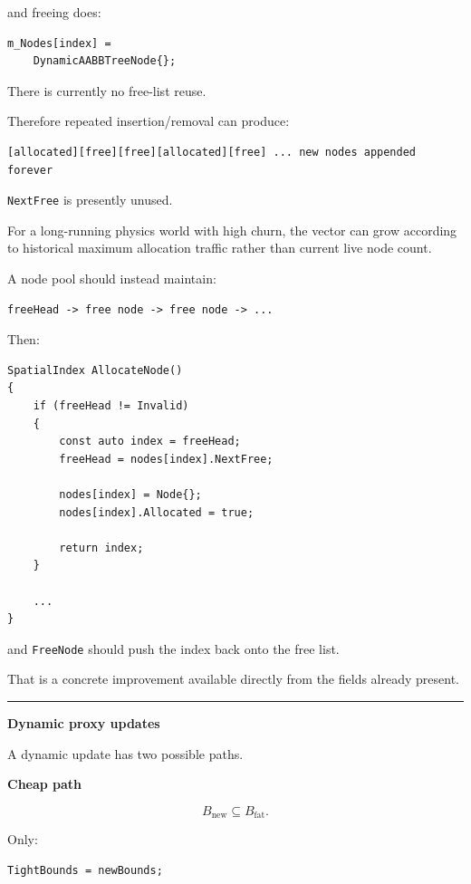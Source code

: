 and freeing does:

\begin{verbatim}
m_Nodes[index] =
    DynamicAABBTreeNode{};
\end{verbatim}

There is currently no free-list reuse.

Therefore repeated insertion/removal can produce:

\begin{verbatim}
[allocated][free][free][allocated][free] ... new nodes appended forever
\end{verbatim}

\texttt{NextFree} is presently unused.

For a long-running physics world with high churn, the vector can grow according to historical maximum allocation traffic rather than current live node count.

A node pool should instead maintain:

\begin{verbatim}
freeHead -> free node -> free node -> ...
\end{verbatim}

Then:

\begin{verbatim}
SpatialIndex AllocateNode()
{
    if (freeHead != Invalid)
    {
        const auto index = freeHead;
        freeHead = nodes[index].NextFree;

        nodes[index] = Node{};
        nodes[index].Allocated = true;

        return index;
    }

    ...
}
\end{verbatim}

and \texttt{FreeNode} should push the index back onto the free list.

That is a concrete improvement available directly from the fields already present.

\begin{center}\rule{0.5\linewidth}{0.5pt}\end{center}

\textbf{Dynamic proxy updates}

A dynamic update has two possible paths.

\textbf{Cheap path}

\[
B_{\text{new}}\subseteq B_{\text{fat}}.
\]

Only:

\begin{verbatim}
TightBounds = newBounds;
\end{verbatim}

